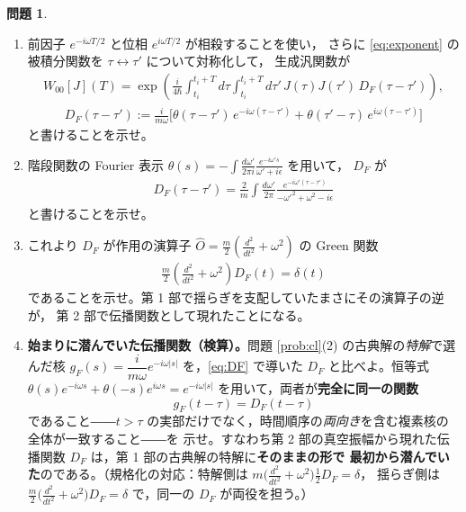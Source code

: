 \documentclass[dvipdfmx, uplatex]{jsarticle}
\theoremstyle{definition}
\newtheorem{prob}{問題}
\begin{document}
\begin{prob}\label{prob:DF}
\begin{enumerate}
\item 前因子 $e^{-i\omega T/2}$ と位相 $e^{i\omega T/2}$ が相殺することを使い，
さらに \eqref{eq:exponent} の被積分関数を $\tau\leftrightarrow\tau'$ について対称化して，
生成汎関数が
\begin{align}
    W_{00}[J](T)
    =\exp\!\left(\frac{i}{4\hbar}
    \int_{t_i}^{t_i+T}\!\!d\tau\int_{t_i}^{t_i+T}\!\!d\tau'\,
    J(\tau)J(\tau')\,D_F(\tau-\tau')\right),
\label{eq:Wfinal}
\end{align}
\begin{align}
    D_F(\tau-\tau')
    :=\frac{i}{m\omega}
    \big[\theta(\tau-\tau')\,e^{-i\omega(\tau-\tau')}+\theta(\tau'-\tau)\,e^{i\omega(\tau-\tau')}\big]
\label{eq:DF}
\end{align}
と書けることを示せ。
\item 階段関数の Fourier 表示
$\theta(s)=-\int\frac{d\omega'}{2\pi i}\frac{e^{-i\omega's}}{\omega'+i\epsilon}$ を用いて，
$D_F$ が
\begin{align}
    D_F(\tau-\tau')
    =\frac{2}{m}\int\frac{d\omega'}{2\pi}
    \frac{e^{-i\omega'(\tau-\tau')}}{-\omega'^2+\omega^2-i\epsilon}
\label{eq:DFfourier}
\end{align}
と書けることを示せ。
\item これより $D_F$ が作用の演算子 $\hat O=\frac{m}{2}(\frac{d^2}{dt^2}+\omega^2)$ の Green 関数
\begin{align}
    \frac{m}{2}\left(\frac{d^2}{dt^2}+\omega^2\right)D_F(t)=\delta(t)
\end{align}
であることを示せ。第 1 部で揺らぎを支配していたまさにその演算子の逆が，
第 2 部で伝播関数として現れたことになる。
\item \textbf{始まりに潜んでいた伝播関数（検算）。}問題 \ref{prob:cl}(2) の古典解の\emph{特解}で選んだ核
$g_F(s)=\dfrac{i}{m\omega}e^{-i\omega|s|}$ を，\eqref{eq:DF} で導いた $D_F$ と比べよ。恒等式
$\theta(s)e^{-i\omega s}+\theta(-s)e^{i\omega s}=e^{-i\omega|s|}$ を用いて，両者が\textbf{完全に同一の関数}
\[
    g_F(t-\tau)=D_F(t-\tau)
\]
であること――$t>\tau$ の実部だけでなく，時間順序の\emph{両向き}を含む複素核の全体が一致すること――を
示せ。すなわち第 2 部の真空振幅から現れた伝播関数 $D_F$ は，第 1 部の古典解の特解に\textbf{そのままの形で
最初から潜んでいた}のである。（規格化の対応：特解側は $m\bigl(\frac{d^2}{dt^2}+\omega^2\bigr)\tfrac12 D_F=\delta$，
揺らぎ側は $\frac m2\bigl(\frac{d^2}{dt^2}+\omega^2\bigr)D_F=\delta$ で，同一の $D_F$ が両役を担う。）
\end{enumerate}
\end{prob}
\end{document}
